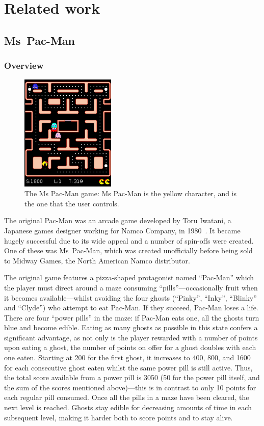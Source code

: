 \chapter{Related work}
\label{ch:related}


\section{Ms~Pac-Man}

\subsection{Overview}

\begin{figure}[ht]
\centering
\includegraphics[width=0.4\textwidth]{diagrams/pac-man}
\caption[The Ms Pac-Man game]{The Ms Pac-Man game: Ms Pac-Man is the yellow character, and is the one that the user controls.}
\label{fig:pac-man}
\end{figure}

The original Pac-Man was an arcade game developed by Toru Iwatani, a Japanese games designer working for Namco Company, in 1980~\citep{Samothrakis2011}.  It became hugely successful due to its wide appeal and a number of spin-offs were created.  One of these was Ms~Pac-Man, which was created unofficially before being sold to Midway Games, the North American Namco distributor.

The original game features a pizza-shaped protagonist named ``Pac-Man'' which the player must direct around a maze consuming ``pills''---occasionally fruit when it becomes available---whilst avoiding the four ghosts (``Pinky'', ``Inky'', ``Blinky'' and ``Clyde'') who attempt to eat Pac-Man.  If they succeed, Pac-Man loses a life.  There are four ``power pills'' in the maze: if Pac-Man eats one, all the ghosts turn blue and become edible.  Eating as many ghosts as possible in this state confers a significant advantage, as not only is the player rewarded with a number of points upon eating a ghost, the number of points on offer for a ghost doubles with each one eaten.  Starting at 200 for the first ghost, it increases to 400, 800, and 1600 for each consecutive ghost eaten whilst the same power pill is still active.  Thus, the total score available from a power pill is 3050 (50 for the power pill itself, and the sum of the scores mentioned above)---this is in contrast to only 10 points for each regular pill consumed.  Once all the pills in a maze have been cleared, the next level is reached.  Ghosts stay edible for decreasing amounts of time in each subsequent level, making it harder both to score points and to stay alive.

